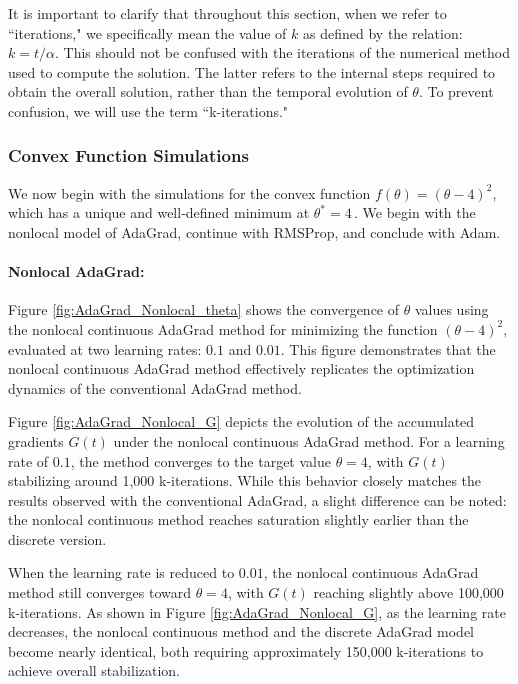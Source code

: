 \documentclass{article} %
\begin{document}
It is important to clarify that throughout this section, when we refer to ``iterations," we specifically mean the value of \( k \) as defined by the relation: \( k = t/\alpha \). This should not be confused with the iterations of the numerical method used to compute the solution. The latter refers to the internal steps required to obtain the overall solution, rather than the temporal evolution of \(\theta\). To prevent confusion, we will use the term ``k-iterations."

\subsubsection{Convex Function Simulations}

We now begin with the simulations for the convex function $f(\theta) = (\theta-4)^2$, which has a unique and well-defined minimum at $\theta^*=4\,.$ We begin with the nonlocal model of AdaGrad, continue with RMSProp, and conclude with Adam.

\paragraph{Nonlocal AdaGrad:} Figure \ref{fig:AdaGrad_Nonlocal_theta} shows the convergence of \(\theta\) values using the nonlocal continuous AdaGrad method for minimizing the function \((\theta - 4)^2\), evaluated at two learning rates: \(0.1\) and \(0.01\). This figure demonstrates that the nonlocal continuous AdaGrad method effectively replicates the optimization dynamics of the conventional AdaGrad method.

Figure \ref{fig:AdaGrad_Nonlocal_G} depicts the evolution of the accumulated gradients \(G(t)\) under the nonlocal continuous AdaGrad method. For a learning rate of \(0.1\), the method converges to the target value \(\theta = 4\), with \(G(t)\) stabilizing around 1,000 k-iterations. While this behavior closely matches the results observed with the conventional AdaGrad, a slight difference can be noted: the nonlocal continuous method reaches saturation slightly earlier than the discrete version.

When the learning rate is reduced to \(0.01\), the nonlocal continuous AdaGrad method still converges toward \(\theta = 4\), with \(G(t)\) reaching slightly above 100,000 k-iterations. As shown in Figure \ref{fig:AdaGrad_Nonlocal_G}, as the learning rate decreases, the nonlocal continuous method and the discrete AdaGrad model become nearly identical, both requiring approximately 150,000 k-iterations to achieve overall stabilization.
\end{document}
